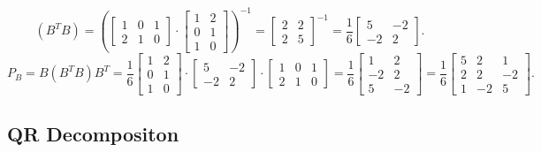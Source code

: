 \documentclass[14pt, notitlepage]{article}
\begin{document}
\[
    \left( B^T B \right) = \left( \begin{bmatrix}
        1 & 0 & 1 \\
        2 & 1 & 0
    \end{bmatrix} \cdot \begin{bmatrix}
        1 & 2 \\
        0 & 1 \\
        1 & 0
    \end{bmatrix} \right)^{-1} = \begin{bmatrix}
        2 & 2 \\
        2 & 5
    \end{bmatrix}^{-1} = \frac{1}{6} \begin{bmatrix}
        5 & -2 \\
        -2 & 2
    \end{bmatrix}.
\]
\[
    P_{B} = B\left( B^T B \right)B^T = \frac{1}{6} \begin{bmatrix}
        1 & 2 \\
        0 & 1 \\
        1 & 0
    \end{bmatrix} \cdot \begin{bmatrix}
        5 & -2 \\
        -2 & 2
    \end{bmatrix} \cdot \begin{bmatrix}
        1 & 0 & 1 \\
        2 & 1 & 0
    \end{bmatrix} = \frac{1}{6} \begin{bmatrix}
         1 &  2 \\
        -2 &  2 \\
         5 & -2
    \end{bmatrix} = \frac{1}{6} \begin{bmatrix}
        5 & 2 &  1 \\
        2 & 2 & -2 \\
        1 & -2 & 5
    \end{bmatrix}.
\]

\subsection*{QR Decompositon}
\end{document}
